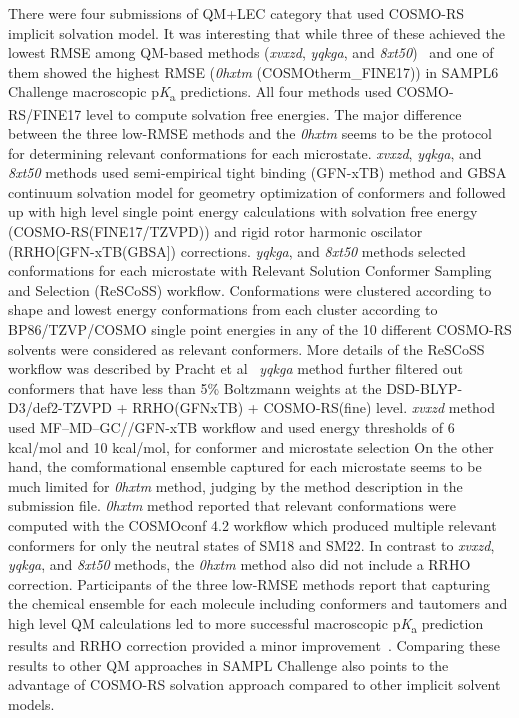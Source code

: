 \documentclass[9pt,lineno,final]{elife}
\newcommand{\pKa}{p\textit{K}\textsubscript{a}}
\begin{document}
There were four submissions of QM+LEC category that used COSMO-RS implicit solvation model. 
It was interesting that while three of these achieved the lowest RMSE among QM-based methods (\textit{xvxzd}, \textit{yqkga}, and \textit{8xt50})~\citep{Pracht:2018:J.Comput.AidedMol.Des.} and one of them showed the highest RMSE (\textit{0hxtm} (COSMOtherm\_FINE17)) in SAMPL6 Challenge macroscopic \pKa{} predictions. 
All four methods used COSMO-RS/FINE17 level to compute solvation free energies. The major difference between the three low-RMSE methods and the \textit{0hxtm} seems to be the protocol for determining relevant conformations for each microstate. 
\textit{xvxzd}, \textit{yqkga}, and \textit{8xt50} methods used semi-empirical tight binding (GFN-xTB) method and GBSA continuum solvation model for geometry optimization of conformers and followed up with high level single point energy calculations with solvation free energy (COSMO-RS(FINE17/TZVPD)) and rigid rotor harmonic oscilator (RRHO[GFN-xTB(GBSA]) corrections. 
\textit{yqkga}, and \textit{8xt50} methods selected  conformations for each microstate with Relevant Solution Conformer Sampling and Selection (ReSCoSS) workflow. Conformations were clustered according to shape and lowest energy conformations from each cluster according to BP86/TZVP/COSMO single point energies in any of the 10 different COSMO-RS solvents were considered as relevant conformers. More details of the ReSCoSS workflow was described by Pracht et al~\citep{Pracht:2018:J.Comput.AidedMol.Des.}
\textit{yqkga} method further filtered out conformers that have less than 5\% Boltzmann weights at the DSD-BLYP-D3/def2-TZVPD + RRHO(GFNxTB) + COSMO-RS(fine) level.
\textit{xvxzd} method used MF–MD–GC//GFN-xTB workflow and used energy thresholds of 6 kcal/mol and 10 kcal/mol, for conformer and microstate selection
On the other hand, the comformational ensemble captured for each microstate seems to be much limited for \textit{0hxtm} method, judging by the method description in the submission file. \textit{0hxtm} method reported that relevant conformations were computed with the COSMOconf 4.2 workflow which produced multiple relevant conformers for only the neutral states of SM18 and SM22.  
In contrast to \textit{xvxzd}, \textit{yqkga}, and \textit{8xt50} methods, the \textit{0hxtm} method also did not include a RRHO correction.
Participants of the three low-RMSE methods report that capturing the chemical ensemble for each molecule including conformers and tautomers and high level QM calculations led to more successful macroscopic \pKa{} prediction results and RRHO correction provided a minor improvement~\citep{Pracht:2018:J.Comput.AidedMol.Des.}. Comparing these results to other QM approaches in SAMPL Challenge also points to the advantage of COSMO-RS solvation approach compared to other implicit solvent models.
\end{document}
